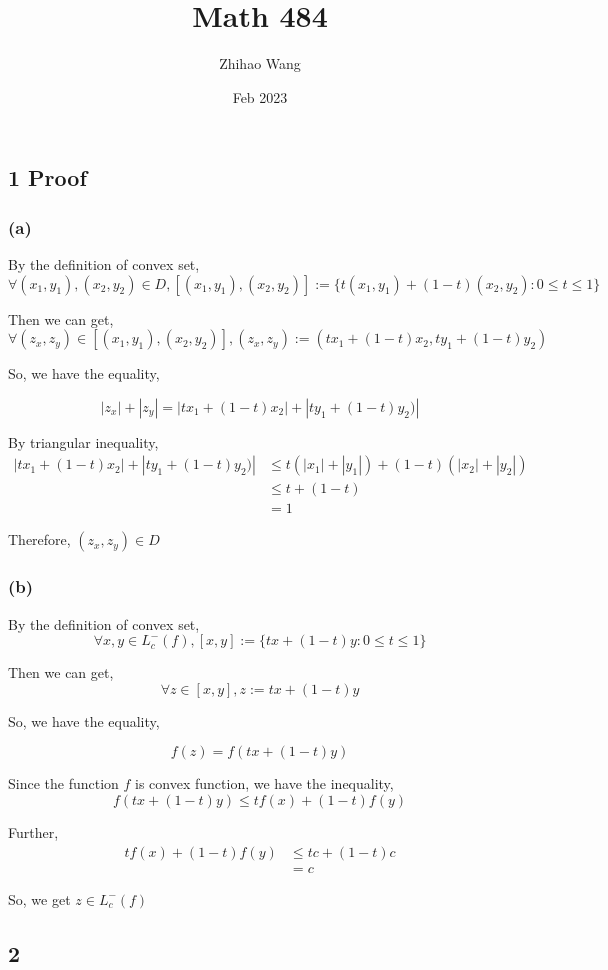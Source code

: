 \documentclass{article}
\title{Math 484}
\author{Zhihao Wang}
\date{Feb 2023}
\begin{document}
\maketitle

\subsection*{1 Proof}
\subsubsection*{(a)}

By the definition of convex set,
$$\forall (x_1, y_1), (x_2, y_2)  \in D, [(x_1, y_1), (x_2, y_2)] := \{t(x_1, y_1)+ (1 - t)(x_2, y_2) : 0 \le t \le 1 \}$$

Then we can get,
$$\forall (z_x, z_y) \in [(x_1, y_1), (x_2, y_2)], (z_x, z_y) := (tx_1 + (1 - t)x_2, ty_1 + (1 - t)y_2)$$

So, we have the equality,

$$|z_x| + |z_y| = |tx_1 + (1 - t)x_2| + | ty_1 + (1 - t)y_2)| $$

By triangular inequality, 
\[
\begin{split}
|tx_1 + (1 - t)x_2| + | ty_1 + (1 - t)y_2)| &\le t(|x_1| + |y_1|) + (1-t)(|x_2| + |y_2|) \\
&\le t + (1 - t) \\
& = 1
\end{split}
\]

Therefore, $(z_x, z_y)  \in D$
\subsubsection*{(b)}
By the definition of convex set,
$$\forall x, y \in L_c^{-}(f), [x, y] := \{tx + (1 - t)y : 0 \le t \le 1 \}$$

Then we can get,
$$\forall z \in [x, y], z := tx + (1 - t)y$$

So, we have the equality,

$$f(z) = f(tx + (1-t)y)$$

Since the function $f$ is convex function, we have the inequality,
$$ f(tx + (1-t)y) \le tf(x) + (1-t)f(y)$$

Further,
\[
\begin{split}
 tf(x) + (1-t)f(y) &\le tc + (1-t)c \\
&= c
\end{split}
\]

So, we get $z \in  L_c^{-}(f)$ 
\subsection*{2 }
\end{document}
